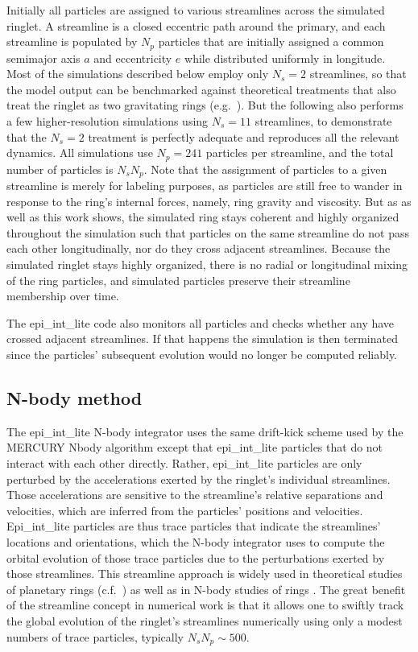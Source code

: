 \documentclass[preprint]{aastex62}
\begin{document}
Initially all particles are assigned to various streamlines across the simulated ringlet. A streamline
is a closed eccentric path around the primary, and each streamline is populated by $N_p$ particles that are
initially assigned a common semimajor axis $a$ and eccentricity $e$ while
distributed uniformly in longitude. Most of the simulations described below
employ only $N_s=2$ streamlines, so that the model output can be benchmarked against
theoretical treatments that also treat the ringlet as two gravitating rings
(e.g.\ \citealt{BGT83}). But the following also performs a few higher-resolution simulations
using $N_s=11$ streamlines, to demonstrate that the $N_s=2$ treatment is perfectly
adequate and reproduces all the relevant dynamics. All simulations use $N_p=241$ particles 
per streamline, and the total number of particles is $N_sN_p$.
Note that the assignment of particles to a given streamline is merely
for labeling purposes, as particles are still free to wander in response
to the ring’s internal forces, namely, ring gravity and viscosity. But as \cite{HS13} as well
as this work shows, the simulated ring stays coherent and highly organized throughout the 
simulation such that particles on the same streamline do not pass each other longitudinally,
nor do they cross adjacent streamlines. Because the simulated ringlet stays highly organized,
there is no radial or longitudinal mixing of the ring particles, and simulated particles preserve
their streamline membership over time. 

The epi\_int\_lite code also monitors all particles and checks whether any have crossed adjacent streamlines.
If that happens the simulation is then terminated since the particles' subsequent evolution
would no longer be computed reliably.

\subsection{N-body method}
\label{subsec:N-body method}

The epi\_int\_lite N-body integrator uses the same drift-kick
scheme used by the MERCURY Nbody algorithm \citep{C99} except that
epi\_int\_lite particles that do not interact with each other directly.
Rather, epi\_int\_lite particles
are only perturbed by the accelerations exerted by the ringlet's individual streamlines. 
Those accelerations are sensitive to the streamline's relative separations and velocities, 
which are inferred from the particles' positions
and velocities. Epi\_int\_lite particles are thus trace particles
that indicate the streamlines' locations and orientations, which the N-body
integrator uses to compute the orbital evolution of those trace particles
due to the perturbations exerted by those streamlines. This streamline approach 
is widely used in theoretical studies of planetary rings (c.f.\ \citealt{GT79, BGT83, BGT85})
as well as in N-body studies of rings \citep{HS13, RHH16}. The great benefit of the streamline concept
in numerical work is that it allows one to swiftly track the 
global evolution of the ringlet's streamlines numerically
using only a modest numbers of trace particles, typically $N_sN_p\sim500$.
\end{document}
